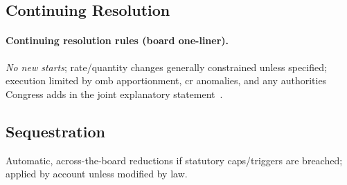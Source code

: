 \documentclass[../main.tex]{subfiles}
\begin{document}
\subsection{Continuing Resolution}
\paragraph{Continuing resolution rules (board one-liner).}
\emph{No new starts}; rate/quantity changes generally constrained unless specified; execution limited by \ac{omb} apportionment, \ac{cr} anomalies, and any authorities Congress adds in the joint explanatory statement~\autocite{CRS-CR}.

\subsection{Sequestration}
Automatic, across-the-board reductions if statutory caps/triggers are breached; applied by account unless modified by law.
\end{document}
